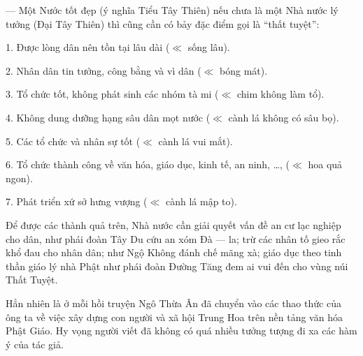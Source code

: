  —  Một Nước tốt đẹp (ý nghĩa Tiểu Tây Thiên) nếu chưa là một Nhà nước lý tưởng (Đại Tây Thiên) thì cũng cần có bảy đặc điểm gọi là ``thất tuyệt'':

1. Được lòng dân nên tồn tại lâu dài ($\ll$ sống lâu).

2. Nhân dân tin tưởng, công bằng và vì dân ($\ll$ bóng mát).

3. Tổ chức tốt, không phát sinh các nhóm tà mi ($\ll$ chim không làm tổ).

4. Không dung dưỡng hạng sâu dân mọt nước ($\ll$ cành lá không có sâu bọ).

5. Các tổ chức và nhân sự tốt ($\ll$ cành lá vui mắt).

6. Tổ chức thành công về văn hóa, giáo dục, kinh tế, an ninh, \ldots, ($\ll$ hoa quả ngon).

7. Phát triển xứ sở hưng vượng ($\ll$ cành lá mập to).

Để được các thành quả trên, Nhà nước cần giải quyết vấn đề an cư lạc nghiệp cho dân, như phái đoàn Tây Du cứu an xóm Đà — la; trừ các nhân tố gieo rắc khổ đau cho nhân dân; như Ngộ Không đánh chế mãng xà; giáo dục theo tinh thần giáo lý nhà Phật như phái đoàn Đường Tăng đem ai vui đến cho vùng núi Thất Tuyệt.

Hẳn nhiên là ở mỗi hồi truyện Ngô Thừa Ân đã chuyển vào các thao thức của ông ta về việc xây dựng con người và xã hội Trung Hoa trên nền tảng văn hóa Phật Giáo. Hy vọng người viết đã không có quá nhiều tưởng tượng đi xa các hàm ý của tác giả.

